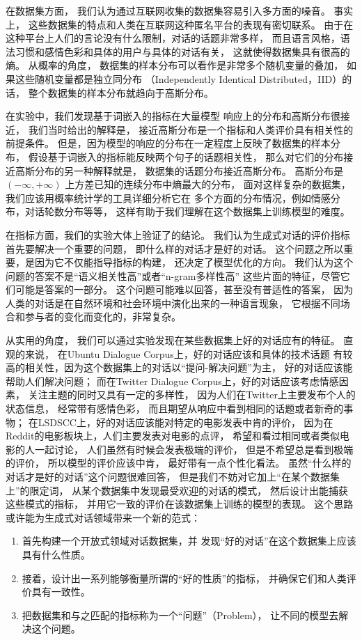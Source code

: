 在数据集方面，
我们认为通过互联网收集的数据集容易引入多方面的噪音。
事实上，
这些数据集的特点和人类在互联网这种匿名平台的表现有密切联系。
由于在这种平台上人们的言论没有什么限制，对话的话题非常多样，
而且语言风格，语法习惯和感情色彩和具体的用户与具体的对话有关，
这就使得数据集具有很高的熵。
从概率的角度，
数据集的样本分布可以看作是非常多个随机变量的叠加，
如果这些随机变量都是独立同分布
（Independently Identical Distributed，IID）的话，
整个数据集的样本分布就趋向于高斯分布。

在实验中，我们发现基于词嵌入的指标在大量模型
响应上的分布和高斯分布很接近，
我们当时给出的解释是，
接近高斯分布是一个指标和人类评价具有相关性的前提条件。
但是，因为模型的响应的分布在一定程度上反映了数据集的样本分布，
假设基于词嵌入的指标能反映两个句子的话题相关性，
那么对它们的分布接近高斯分布的另一种解释就是，
数据集的话题分布接近高斯分布。
高斯分布是$(-\infty, +\infty)$
上方差已知的连续分布中熵最大的分布，
面对这样复杂的数据集，我们应该用概率统计学的工具详细分析它在
多个方面的分布情况，例如情感分布，对话轮数分布等等，
这样有助于我们理解在这个数据集上训练模型的难度。

在指标方面，我们的实验大体上验证了的结论。
我们认为生成式对话的评价指标首先要解决一个重要的问题，
即什么样的对话才是好的对话。
这个问题之所以重要，是因为它不仅能指导指标的构建，
还决定了模型优化的方向。
我们认为这个问题的答案不是“语义相关性高”或者“n-gram多样性高”
这些片面的特征，尽管它们可能是答案的一部分。
这个问题可能难以回答，甚至没有普适性的答案，
因为人类的对话是在自然环境和社会环境中演化出来的一种语言现象，
它根据不同场合和参与者的变化而变化的，非常复杂。

从实用的角度，
我们可以通过实验发现在某些数据集上好的对话应有的特征。
直观的来说，
在Ubuntu Dialogue Corpus上，好的对话应该和具体的技术话题
有较高的相关性，因为这个数据集上的对话以“提问-解决问题”为主，
好的对话应该能帮助人们解决问题；
而在Twitter Dialogue Corpus上，好的对话应该考虑情感因素，
关注主题的同时又具有一定的多样性，
因为人们在Twitter上主要发布个人的状态信息，
经常带有感情色彩，
而且期望从响应中看到相同的话题或者新奇的事物；
在LSDSCC上，好的对话应该能对特定的电影发表中肯的评价，
因为在Reddit的电影板块上，人们主要发表对电影的点评，
希望和看过相同或者类似电影的人一起讨论，
人们虽然有时候会发表极端的评价，
但是不希望总是看到极端的评价，
所以模型的评价应该中肯，
最好带有一点个性化看法。
虽然“什么样的对话才是好的对话”这个问题很难回答，
但是我们不妨对它加上“在某个数据集上”的限定词，
从某个数据集中发现最受欢迎的对话的模式，
然后设计出能捕获这些模式的指标，
并用它一致的评价在该数据集上训练的模型的表现。
这个思路或许能为生成式对话领域带来一个新的范式：
\begin{enumerate}
    \item 首先构建一个开放式领域对话数据集，并
    发现“好的对话”在这个数据集上应该具有什么性质。
    \item 接着，设计出一系列能够衡量所谓的“好的性质”的指标，
    并确保它们和人类评价具有一致性。
    \item 把数据集和与之匹配的指标称为一个“问题”（Problem），
    让不同的模型去解决这个问题。
\end{enumerate}

